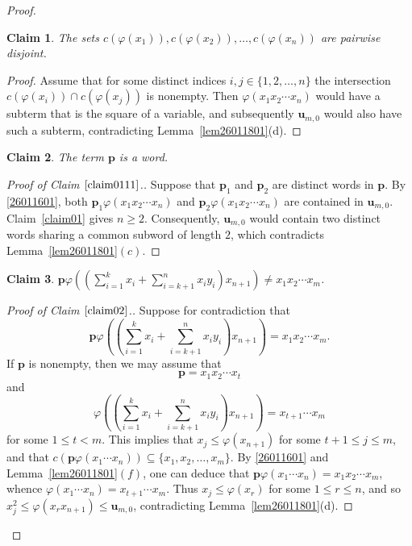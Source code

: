 \documentclass[reqno]{amsart}
\theoremstyle{plain}
\newtheorem{claim}{Claim}[section]
\theoremstyle{definition}
\newcommand{\bp}{\mathbf{p}}
\newcommand{\bu}{\mathbf{u}}
\begin{document}
\begin{proof}
\begin{claim}\label{claim555}
The sets $c(\varphi(x_1)), c(\varphi(x_2)), \ldots, c(\varphi(x_n))$ are pairwise disjoint.
\end{claim}
\begin{proof}
Assume that for some distinct indices $i, j\in\{1, 2, \ldots, n\}$
the intersection $c(\varphi(x_i))\cap c(\varphi(x_j))$ is nonempty.
Then $\varphi(x_1x_2\cdots x_n)$ would have a subterm that is the square of a variable,
and subsequently $\bu_{m,0}$ would also have such a subterm,
contradicting Lemma~\ref{lem26011801}(d).
\end{proof}

\begin{claim}\label{claim0111}
The term $\bp$ is a word.
\end{claim}
\begin{proof}[Proof of Claim $\ref{claim0111}$.]
Suppose that $\bp_1$ and $\bp_2$ are distinct words in $\bp$.
By \eqref{26011601}, both $\bp_1\varphi(x_1x_2\cdots x_n)$ and $\bp_2\varphi(x_1x_2\cdots x_n)$ are contained in $\bu_{m,0}$.
Claim~\ref{claim01} gives $n\geq2$.
Consequently, $\bu_{m,0}$ would contain two distinct words sharing a common subword of length $2$,
which contradicts Lemma~\ref{lem26011801}$(c)$.
\end{proof}


\begin{claim}\label{claim02}
$\displaystyle \bp\varphi\left(\left(\sum_{i=1}^kx_i
               +\sum_{i=k+1}^nx_iy_i\right)x_{n+1}\right)\neq x_1x_2\cdots x_m$.
\end{claim}
\begin{proof}[Proof of Claim $\ref{claim02}$.]
Suppose for contradiction that
\[
\bp\varphi\left(\left(\sum_{i=1}^kx_i
               +\sum_{i=k+1}^nx_iy_i\right)x_{n+1}\right)= x_1x_2\cdots x_m.
\]
If $\bp$ is nonempty, then we may assume that
\[
\bp=x_1x_2\cdots x_t
\]
and
\[
\varphi\left(\left(\sum_{i=1}^kx_i
               +\sum_{i=k+1}^nx_iy_i\right)x_{n+1}\right)=x_{t+1}\cdots x_m
\]
for some $1\leq t<m$.
This implies that $x_j\leq\varphi(x_{n+1})$ for some $t+1\leq j\leq m$,
and that $c(\bp\varphi(x_1\cdots x_n))\subseteq\{x_1, x_2, \dots, x_m\}$.
By \eqref{26011601} and Lemma~\ref{lem26011801}$(f)$, one can deduce that $\bp\varphi(x_1\cdots x_n)=x_1x_2\cdots x_m$,
whence $\varphi(x_1\cdots x_n)=x_{t+1}\cdots x_m$.
Thus $x_j\leq\varphi(x_r)$ for some $1\leq r\leq n$,
and so $x_j^2\leq\varphi(x_rx_{n+1})\leq \bu_{m, 0}$,
contradicting Lemma~\ref{lem26011801}(d).


\end{proof}
\end{proof}
\end{document}
